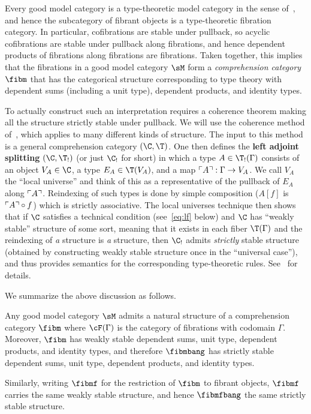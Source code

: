 Every good model category is a type-theoretic model category in the sense of~\cite{shulman:invdia}, and hence the subcategory of fibrant objects is a type-theoretic fibration category.
In particular, cofibrations are stable under pullback, so acyclic cofibrations are stable under pullback along fibrations, and hence dependent products of fibrations along fibrations are fibrations.
Taken together, this implies that the fibrations in a good model category $\sM$ form a \emph{comprehension category} $\fibm$ that has the categorical structure corresponding to type theory with dependent sums (including a unit type), dependent products, and identity types.

To actually construct such an interpretation requires a coherence theorem making all the structure strictly stable under pullback.
We will use the coherence method of~\cite{lw:localuniv}, which applies to many different kinds of structure.
The input to this method is a general comprehension category $(\C,\T)$.
One then defines the \textbf{left adjoint splitting} $(\C,\T_!)$ (or just $\C_!$ for short) in which a type $A\in \T_!(\Gamma)$ consists of an object $V_A\in\C$, a type $E_A\in\T(V_A)$, and a map $\ulcorner A\urcorner:\Gamma\to V_A$.
We call $V_A$ the ``local universe'' and think of this as a representative of the pullback of $E_A$ along $\ulcorner A\urcorner$.
Reindexing of such types is done by simple composition ($A[f]$ is $\ulcorner A\urcorner\circ f$) which is strictly associative.
The local universes technique then shows that if $\C$ satisfies a technical condition (see~\eqref{eq:lf} below) and $\C$ has ``weakly stable'' structure of some sort, meaning that it exists in each fiber $\T(\Gamma)$ and the reindexing of \emph{a} structure is \emph{a} structure, then $\C_!$ admits \emph{strictly} stable structure (obtained by constructing weakly stable structure once in the ``universal case''), and thus provides semantics for the corresponding type-theoretic rules.
See~\cite{lw:localuniv} for details.

We summarize the above discussion as follows.

\begin{thm}\label{thm:gmc-tt}
  Any good model category $\sM$ admits a natural structure of a comprehension category $\fibm$ where $\cF(\Gamma)$ is the category of fibrations with codomain $\Gamma$.
  Moreover, $\fibm$ has weakly stable dependent sums, unit type, dependent products, and identity types, and therefore $\fibmbang$ has strictly stable dependent sums, unit type, dependent products, and identity types.

  Similarly, writing $\fibmf$ for the restriction of $\fibm$ to fibrant objects, $\fibmf$ carries the same weakly stable structure, and hence $\fibmfbang$ the same strictly stable structure.
\end{thm}


